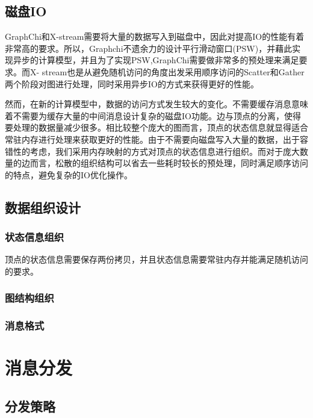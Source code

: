 \subsection{磁盘IO}
GraphChi和X-stream需要将大量的数据写入到磁盘中，因此对提高IO的性能有着非常高的要求。所以，Graphchi不遗余力的设计平行滑动窗口(PSW)，并藉此实现异步的计算模型，并且为了实现PSW,GraphChi需要做非常多的预处理来满足要求。而X- stream也是从避免随机访问的角度出发采用顺序访问的Scatter和Gather两个阶段对图进行处理，同时采用异步IO的方式来获得更好的性能。

然而，在新的计算模型中，数据的访问方式发生较大的变化。不需要缓存消息意味着不需要为缓存大量的中间消息设计复杂的磁盘IO功能。边与顶点的分离，使得要处理的数据量减少很多。相比较整个庞大的图而言，顶点的状态信息就显得适合常驻内存进行处理来获取更好的性能。由于不需要向磁盘写入大量的数据，出于容错性的考虑，我们采用内存映射的方式对顶点的状态信息进行组织。而对于庞大数量的边而言，松散的组织结构可以省去一些耗时较长的预处理，同时满足顺序访问的特点，避免复杂的IO优化操作。

\subsection{数据组织设计}

\subsubsection{状态信息组织}
顶点的状态信息需要保存两份拷贝，并且状态信息需要常驻内存并能满足随机访问的要求。



\subsubsection{图结构组织}

\subsubsection{消息格式}


\section{消息分发}
\subsection{}
\subsection{分发策略}

